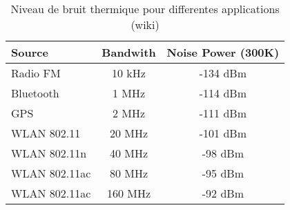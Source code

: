 \begin{table}
    \caption{Niveau de bruit thermique pour differentes applications (wiki)}
    \label{tab:thermal-noise}
    \begin{tabular}{l|c|c}
        \toprule
        Source & Bandwith & Noise Power (300K) \\
        \midrule
        \hline
        Radio FM & 10 kHz & -134 dBm \\
        Bluetooth & 1 MHz & -114 dBm \\
        GPS & 2 MHz & -111 dBm \\
        WLAN 802.11 & 20 MHz & -101 dBm \\
        WLAN 802.11n & 40 MHz & -98 dBm \\
        WLAN 802.11ac & 80 MHz & -95 dBm \\
        WLAN 802.11ac & 160 MHz & -92 dBm \\
        \bottomrule
    \end{tabular}
\end{table}